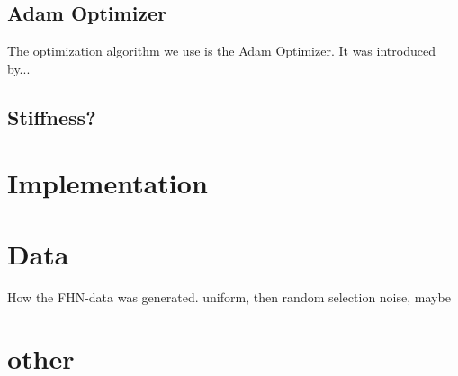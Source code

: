 \subsection{Adam Optimizer} \label{sec:adam}

The optimization algorithm we use is the Adam Optimizer. It was introduced by... 



\subsection{Stiffness?}




\section{Implementation}




\section{Data}

How the FHN-data was generated.
uniform, then random selection
noise, maybe




\section{other}


















